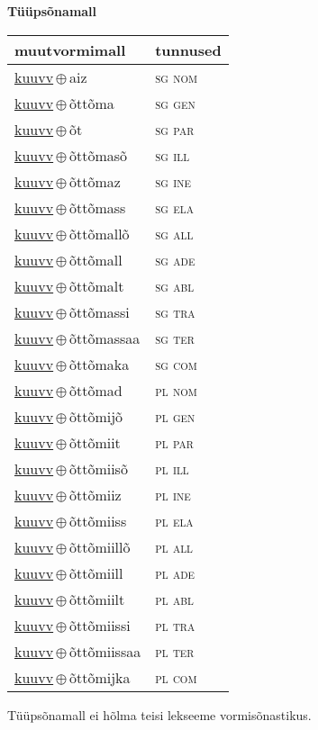 

\vspace{3.5em}
\noindent \begin{minipage}{\textwidth}
\noindent \textbf{Tüüpsõnamall \,}\\

\begin{sideways}
\begin{tabular}{l l}
muutvormimall & tunnused \\
\hline
\underline{kuuvv}\,$\oplus$\,aiz & \textsc{ sg nom } \\
\underline{kuuvv}\,$\oplus$\,õttõma & \textsc{ sg gen } \\
\underline{kuuvv}\,$\oplus$\,õt & \textsc{ sg par } \\
\underline{kuuvv}\,$\oplus$\,õttõmasõ & \textsc{ sg ill } \\
\underline{kuuvv}\,$\oplus$\,õttõmaz & \textsc{ sg ine } \\
\underline{kuuvv}\,$\oplus$\,õttõmass & \textsc{ sg ela } \\
\underline{kuuvv}\,$\oplus$\,õttõmallõ & \textsc{ sg all } \\
\underline{kuuvv}\,$\oplus$\,õttõmall & \textsc{ sg ade } \\
\underline{kuuvv}\,$\oplus$\,õttõmalt & \textsc{ sg abl } \\
\underline{kuuvv}\,$\oplus$\,õttõmassi & \textsc{ sg tra } \\
\underline{kuuvv}\,$\oplus$\,õttõmassaa & \textsc{ sg ter } \\
\underline{kuuvv}\,$\oplus$\,õttõmaka & \textsc{ sg com } \\
\underline{kuuvv}\,$\oplus$\,õttõmad & \textsc{ pl nom } \\
\underline{kuuvv}\,$\oplus$\,õttõmijõ & \textsc{ pl gen } \\
\underline{kuuvv}\,$\oplus$\,õttõmiit & \textsc{ pl par } \\
\underline{kuuvv}\,$\oplus$\,õttõmiisõ & \textsc{ pl ill } \\
\underline{kuuvv}\,$\oplus$\,õttõmiiz & \textsc{ pl ine } \\
\underline{kuuvv}\,$\oplus$\,õttõmiiss & \textsc{ pl ela } \\
\underline{kuuvv}\,$\oplus$\,õttõmiillõ & \textsc{ pl all } \\
\underline{kuuvv}\,$\oplus$\,õttõmiill & \textsc{ pl ade } \\
\underline{kuuvv}\,$\oplus$\,õttõmiilt & \textsc{ pl abl } \\
\underline{kuuvv}\,$\oplus$\,õttõmiissi & \textsc{ pl tra } \\
\underline{kuuvv}\,$\oplus$\,õttõmiissaa & \textsc{ pl ter } \\
\underline{kuuvv}\,$\oplus$\,õttõmijka & \textsc{ pl com } \\
\end{tabular}
\end{sideways}
\label{tab:tüüpsõnamall-kuuvvaiz}

\end{minipage}

 
\vspace{1em}
\noindent Tüüpsõnamall  ei hõlma teisi lekseeme vormi\-sõnastikus.
